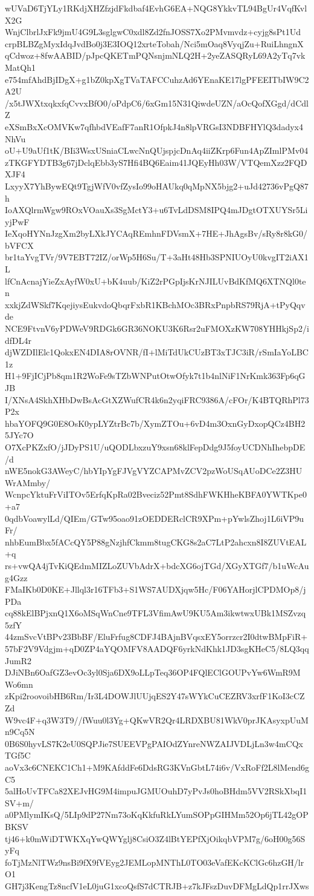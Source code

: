 wUVaD6TjYLy1RKdjXHZfzjdFkdbaf4EvhG6EA+NQG8YkkvTL94BgUr4VqfKvlX2G
WnjClbrlJxFk9jmU4G9L3sglgwC0xdl8Zd2fnJOSS7Xo2PMvmvdz+cyjg8sPt1Ud
crpBLBZgMyxIdqJvdBo0j3E3IOQ12xrteTobah/Nci5mOaq8VyqjZu+RuiLhngnX
qCdwoz+8fwAABID/pJpcQKETmPQNsnjmNLQ2H+2yeZASQRyL69A2yTq7vkMatQh1
e754mfAhdBjIDgX+g1bZ0kpXgTVaTAFCCuhzAd6YEnaKE17lgPFEEITbIW9C2A2U
/x5tJWXtxqkxfqCvvxBfO0/oPdpC6/6xGm15N31QiwdeUZN/aOcQofXGgd/dCdlZ
eXSmBxXcOMVKw7qfhbdVEafF7anR1OfpkJ4n8lpVRGsI3NDBFHYlQ3dadyx4NhVu
oU+U9aUf1tK/BIi3WsxUSniaCLwcNnQUjspjcDnAq4iiZKrp6Fun4ApZImlPMv04
zTKGFYDTB3g67jDclqEbb3yS7Hfi4BQ6Eaim41JQEyHh03W/VTQemXzz2FQDXJF4
LxyyX7YhBywEQt9TgjWfV0vfZysIo99oHAUkq0qMpNX5bjg2+uJd42736vPgQ87h
IoAXQlrmWgw9ROxVOauXs3SgMctY3+u6TvLdDSM8IPQ4mJDgtOTXUYSr5LiyjPwF
IeXqoHYNnJzgXm2byLXkJYCAqREmhnFDVsmX+7HE+JhAgsBv/sRy8r8kG0/bVFCX
br1taYvgTVr/9V7EBT72IZ/orWp5H6Su/T+3aHt48Hb3SPNIUOyU0kvgIT2iAX1L
lfCnAcnajYieZxAyfW0xU+bK4uub/KiZ2rPGpIjsKrNJILUvBdKfMQ6XTNQl0ten
xxkjZdWSkf7KqejiysEukvdoQbqrFxbR1KBchMOc3BRxPnpbRS79RjA+tPyQqvde
NCE9FtvnV6yPDWeV9RDGk6GR36NOKU3K6Rsr2uFMOXzKW708YHHkjSp2/idfDL4r
djWZDIlElc1QokxEN4DIA8rOVNR/fI+lMiTdUkCUzBT3xTJC3iR/rSmIaYoLBC1z
H1+9FjICjPb8qm1R2WoFe9sTZbWNPutOtwOfyk7t1b4nlNiF1NrKmk363Fp6qGJB
I/XNsA4SkhXHbDwBsAcGtXZWufCR4k6n2yqiFRC9386A/cFOr/K4BTQRhPl73P2x
hbaYOFQ9G0E8OsK0ypLYZtrBc7b/XymZTOu+6vD4m3OxnGyDxopQCz4BH25JYc7O
O7XcPKZxfO/jJDyPS1U/uQODLbxzuY9xsn68klFepDdg9J5foyUCDNhIhebpDE/d
nWE5nokG3AWeyC/hbYIpYgFJVgVYZCAPMvZCV2pzWoUSqAUoDCe2Z3HUWrAMmby/
WcnpcYktuFrViITOv5ErfqKpRa02Bveciz52Pmt8SdhFWKHheKBFA0YWTKpe0+a7
0qdbVoawylLd/QIEm/GTw95oao91zOEDDERclCR9XPm+pYwlsZhoj1L6iVP9uFr/
nhbEumBbx5fACcQY5P88gNzjhfCkmm8tugCKG8s2aC7LtP2ahcxn8I8ZUVtEAL+q
rs+vwQA4jTvKiQEdmMIZLoZUVbAdrX+bdcXG6ojTGd/XGyXTGf7/b1uWcAug4Gzz
FMaIKb0D0KE+Jllql3r16TFb3+S1WS7AUDXjqw5Hc/F06YAHorjlCPDMOp8/jPDa
cq88kElBPjxnQ1X6oMSqWnCne9TFL3VfimAwU9KU5Am3ikwtwxUBk1MSZvzq5zfY
44zmSvcVtBPv23BbBF/EluFrfug8CDFJ4BAjnBVqsxEY5orrzcr2I0dtwBMpFiR+
57bF2V9Vdgjm+qD0ZP4aYQOMFV8AADQF6yrkNdKhk1JD3sgKHeC5/8LQ3qqJumR2
DJiNBn6OafGZ3evOc3yl0Sja6DX9oLLpTeq36OP4FQlEClGOUPvYw6WmR9MWo6mn
zKpi2roovoibHB6Rm/Ir3L4DOWJlUUjqES2Y47sWYkCuCEZRV3xrfF1KoI3cCZZd
W9vc4F+q3W3T9//fWuu0l3Yg+QKwVR2Qr4LRDXBU81WkV0prJKAsyxpUuMn9Cq5N
0B6S0hyvLS7K2eU0SQPJie7SUEEVPgPAIOdZYnreNWZAIJVDLjLn3w4mCQxTGf5C
aoVx3c6CNEKC1Ch1+M9KAfddFe6DdsRG3KVnGbtL74i6v/VxRoFf2L8lMend6gC5
5alHoUvTFCa82XEJvHG9M4impuJGMUOuhD7yPvJs0hoBHdm5VV2RSkXbqI1SV+m/
a0PMlymIKsQ/5LIp9dP27Nm73oKqKkfuRkLYumSOPpGIHMm52Op6jTL42gOPBKSV
tj46+k0mWiDTWKXqYwQWYglj8CsiO3Z4lBtYEPfXjOikqbVPM7g/6oH00g56SyFq
foTjMzNlTWz9nsBi9fX9fVEyg2JEMLopMNThL0TO03eVafEKcKClGc6hzGH/lrO1
GH7j3KengTz8ncfV1eL0juG1xcoQsfS7dCTRJB+z7kJFszDuvDFMgLdQp1rrJXws
